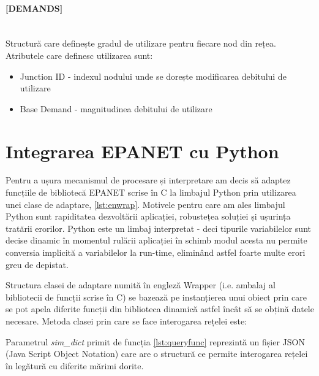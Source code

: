 \paragraph{[DEMANDS]} \mbox{} \\
Structură care definește gradul de utilizare pentru fiecare nod din rețea. Atributele care definesc utilizarea sunt:
\begin{itemize}
    \item Junction ID - indexul nodului unde se dorește modificarea debitului de utilizare
    \item Base Demand - magnitudinea debitului de utilizare
\end{itemize}

\section{Integrarea EPANET cu Python}
Pentru a ușura mecanismul de procesare și interpretare am decis să adaptez funcțiile de bibliotecă EPANET scrise în C la limbajul Python prin utilizarea unei clase de adaptare, \ref{lst:enwrap}. Motivele pentru care am ales limbajul Python sunt rapiditatea dezvoltării aplicației, robustețea soluției și ușurința tratării erorilor. Python este un limbaj interpretat - deci tipurile variabilelor sunt decise dinamic în momentul rulării aplicației în schimb modul acesta nu permite conversia implicită a variabilelor la run-time, eliminând astfel foarte multe erori greu de depistat.

Structura clasei de adaptare numită în engleză Wrapper (i.e. ambalaj al bibliotecii de funcții scrise în C) se bazează pe instanțierea unui obiect prin care se pot apela diferite funcții din biblioteca dinamică astfel încât să se obțină datele necesare.
Metoda clasei prin care se face interogarea rețelei este:


Parametrul \textit{sim\_dict} primit de funcția \ref{lst:queryfunc} reprezintă un fișier JSON (Java Script Object Notation) care are o structură ce permite interogarea rețelei în legătură cu diferite mărimi dorite.

